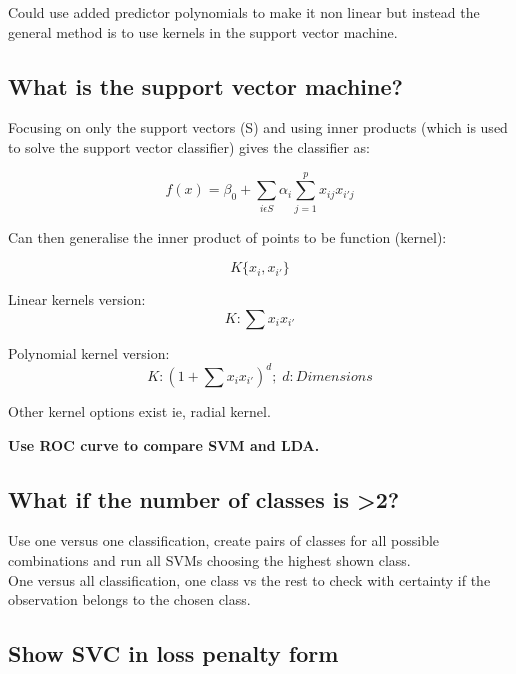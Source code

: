 \documentclass[11pt]{scrartcl} %
\begin{document}
Could use added predictor polynomials to make it non linear but instead the general method is to
use kernels in the support vector machine.

\subsection{What is the support vector machine?}

Focusing on only the support vectors (S) and using inner products (which is used to solve the
support vector classifier) gives the classifier as:

\begin{equation}
	f(x) = \beta_0 + \sum_{i\epsilon S}{\alpha_i\sum^p_{j=1}{x_{ij}x_{i'j}}}
\end{equation}

Can then generalise the inner product of points to be function (kernel):

\begin{equation}
	K\{x_i,x_{i'}\}
\end{equation}

Linear kernels version:
\begin{equation}
	K : \sum{x_ix_{i'}}
\end{equation}

Polynomial kernel version:
\begin{equation}
	K: (1+ \sum{x_ix_{i'}})^d;\; d:Dimensions
\end{equation}

Other kernel options exist ie, radial kernel.

\textbf{Use ROC curve to compare SVM and LDA.}

\subsection{What if the number of classes is >2?}

Use one versus one classification, create pairs of classes for all possible combinations and run
all SVMs choosing the highest shown class.\\

One versus all classification, one class vs the rest to check with certainty if the observation belongs
to the chosen class.

\subsection{Show SVC in loss penalty form}
\end{document}

